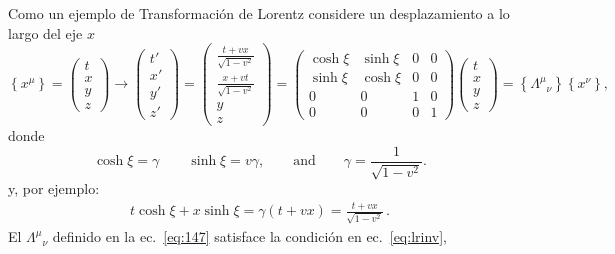 Como un ejemplo de Transformaci\'on de Lorentz considere un desplazamiento a lo largo del eje $x$
\begin{equation}
\label{eq:147}
  \left\{x^\mu\right\}=\begin{pmatrix}
    t\\
    x\\
    y\\
    z
  \end{pmatrix}\to
  \begin{pmatrix}
    t'\\
    x'\\
    y'\\
    z'
  \end{pmatrix}=
  \begin{pmatrix}
    \frac{t+vx}{\sqrt{1-v^2}}\\
    \frac{x+vt}{\sqrt{1-v^2}}\\
    y\\
    z
  \end{pmatrix}=
  \begin{pmatrix}
    \cosh\xi&\sinh\xi&0&0\\
    \sinh\xi&\cosh\xi&0&0\\
    0     &  0  &1&0\\
    0     &  0  &0&1
  \end{pmatrix}
  \begin{pmatrix}
    t\\
    x\\
    y\\
    z
  \end{pmatrix}=\left\{{\Lambda^\mu}_{\nu}\right\}\left\{x^\nu\right\},
\end{equation}
donde
\begin{equation}
  \cosh\xi=\gamma\qquad\sinh\xi=v\gamma,\qquad\text{and}\qquad \gamma=\frac{1}{\sqrt{1-v^2}}.
\end{equation}
y, por ejemplo:
\begin{align}
  t\cosh{\xi}+x\sinh\xi=\gamma(t+v x)=\frac{t+v x}{\sqrt{1-v^2}}\,.
\end{align}
El ${\Lambda^\mu}_{\nu}$ definido en la ec.~\eqref{eq:147} satisface la condici\'on en ec.~\eqref{eq:lrinv}, 
